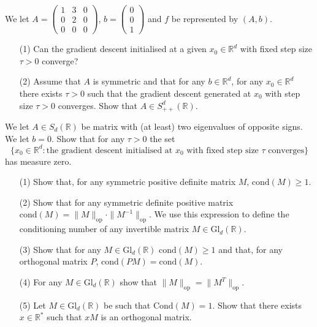 \begin{exercise}
We let $A = \begin{pmatrix}
1 & 3 & 0 \\
0 & 2 & 0 \\
0 & 0 & 0
\end{pmatrix}$, $b = \begin{pmatrix}
0 \\
0 \\
1
\end{pmatrix}$ and $f$ be represented by $(A, b)$.
\begin{enumerate}
    \item[(1)] Can the gradient descent initialised at a given $x_0 \in \mathbb{R}^d$ with fixed step size $\tau > 0$ converge?
    \item[(2)] Assume that $A$ is symmetric and that for any $b \in \mathbb{R}^d$, for any $x_0 \in \mathbb{R}^d$ there exists $\tau > 0$ such that the gradient descent generated at $x_0$ with step size $\tau > 0$ converges. Show that $A \in S_{++}^d(\mathbb{R})$.
\end{enumerate}
\end{exercise}

\begin{exercise}
We let $A \in S_d(\mathbb{R})$ be matrix with (at least) two eigenvalues of opposite signs. We let $b = 0$. Show that for any $\tau > 0$ the set 
\[
\{x_0 \in \mathbb{R}^d : \text{the gradient descent initialised at } x_0 \text{ with fixed step size } \tau \text{ converges}\}
\]
has measure zero.
\end{exercise}

\begin{exercise}
\begin{enumerate}
    \item[(1)] Show that, for any symmetric positive definite matrix $M$, $\text{cond}(M) \geq 1$.
    \item[(2)] Show that for any symmetric definite positive matrix $\text{cond}(M) = \|M\|_{\text{op}} \cdot \|M^{-1}\|_{\text{op}}$. We use this expression to define the conditioning number of any invertible matrix $M \in \text{Gl}_d(\mathbb{R})$.
    \item[(3)] Show that for any $M \in \text{Gl}_d(\mathbb{R})$ $\text{cond}(M) \geq 1$ and that, for any orthogonal matrix $P$, $\text{cond}(PM) = \text{cond}(M)$.
    \item[(4)] For any $M \in \text{Gl}_d(\mathbb{R})$ show that $\|M\|_{\text{op}} = \|M^T\|_{\text{op}}$.
    \item[(5)] Let $M \in \text{Gl}_d(\mathbb{R})$ be such that $\text{Cond}(M) = 1$. Show that there exists $x \in \mathbb{R}^*$ such that $xM$ is an orthogonal matrix.
\end{enumerate}
\end{exercise}

